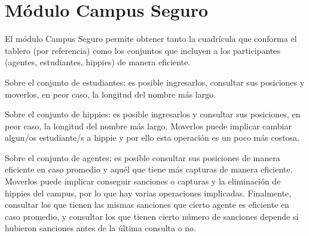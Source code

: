 \section{M\'odulo Campus Seguro}

El m\'odulo Campus Seguro permite obtener tanto la cuadrícula que conforma el tablero (por referencia) como los conjuntos que incluyen a los participantes (agentes, estudiantes, hippies) de manera eficiente.\par
Sobre el conjunto de estudiantes: es posible ingresarlos, consultar sus posiciones y moverlos, en peor caso, la longitud del nombre más largo.\par
Sobre el conjunto de hippies: es posible ingresarlos y consultar sus posiciones, en peor caso, la longitud del nombre más largo. Moverlos puede implicar cambiar algun/os estudiante/s a hippie y por ello esta operaci\'on es un poco más costosa.\par
Sobre el conjunto de agentes: es posible consultar sus posiciones de manera eficiente en caso promedio y aquél que tiene más capturas de manera eficiente. Moverlos puede implicar conseguir sanciones o capturas y la eliminaci\'on de hippies del campus, por lo que hay varias operaciones implicadas. Finalmente, consultar los que tienen las mismas sanciones que cierto agente es eficiente en caso promedio, y consultar los que tienen cierto número de sanciones depende si hubieron sanciones antes de la última consulta o no.\par


